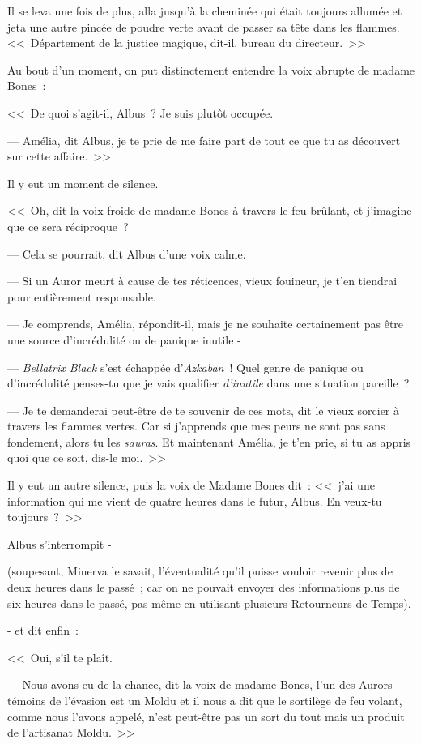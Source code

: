 Il se leva une fois de plus, alla jusqu'à la cheminée qui était toujours allumée et jeta une autre pincée de poudre verte avant de passer sa tête dans les flammes. <<~Département de la justice magique, dit-il, bureau du directeur.~>>

Au bout d'un moment, on put distinctement entendre la voix abrupte de madame Bones~:

<<~De quoi s'agit-il, Albus~? Je suis plutôt occupée.

--- Amélia, dit Albus, je te prie de me faire part de tout ce que tu as découvert sur cette affaire.~>>

Il y eut un moment de silence.

<<~Oh, dit la voix froide de madame Bones à travers le feu brûlant, et j'imagine que ce sera réciproque~?

--- Cela se pourrait, dit Albus d'une voix calme.

--- Si un Auror meurt à cause de tes réticences, vieux fouineur, je t'en tiendrai pour entièrement responsable.

--- Je comprends, Amélia, répondit-il, mais je ne souhaite certainement pas être une source d'incrédulité ou de panique inutile -

--- \emph{Bellatrix Black} s'est échappée d'\emph{Azkaban}~! Quel genre de panique ou d'incrédulité penses-tu que je vais qualifier \emph{d'inutile} dans une situation pareille~?

--- Je te demanderai peut-être de te souvenir de ces mots, dit le vieux sorcier à travers les flammes vertes. Car si j'apprends que mes peurs ne sont pas sans fondement, alors tu les \emph{sauras}. Et maintenant Amélia, je t'en prie, si tu as appris quoi que ce soit, dis-le moi.~>>

Il y eut un autre silence, puis la voix de Madame Bones dit~: <<~j'ai une information qui me vient de quatre heures dans le futur, Albus. En veux-tu toujours~?~>>

Albus s'interrompit -

(soupesant, Minerva le savait, l'éventualité qu'il puisse vouloir revenir plus de deux heures dans le passé~; car on ne pouvait envoyer des informations plus de six heures dans le passé, pas même en utilisant plusieurs Retourneurs de Temps).

- et dit enfin~:

<<~Oui, s'il te plaît.

--- Nous avons eu de la chance, dit la voix de madame Bones, l'un des Aurors témoins de l'évasion est un Moldu et il nous a dit que le sortilège de feu volant, comme nous l'avons appelé, n'est peut-être pas un sort du tout mais un produit de l'artisanat Moldu.~>>


